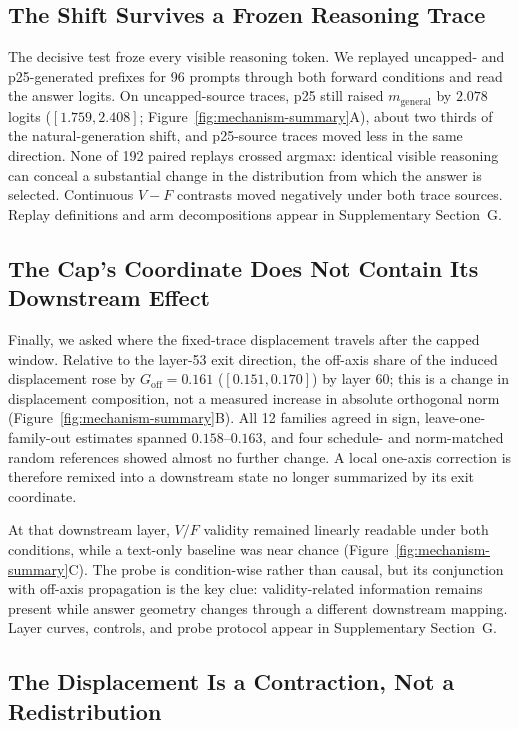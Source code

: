 \documentclass[letterpaper]{article} %
\begin{document}
\subsection{The Shift Survives a Frozen Reasoning Trace}

The decisive test froze every visible reasoning token. We replayed uncapped- and p25-generated prefixes for 96 prompts through both forward conditions and read the answer logits. On uncapped-source traces, p25 still raised $m_{\mathrm{general}}$ by $2.078$ logits ($[1.759,2.408]$; Figure~\ref{fig:mechanism-summary}A), about two thirds of the natural-generation shift, and p25-source traces moved less in the same direction. None of 192 paired replays crossed argmax: identical visible reasoning can conceal a substantial change in the distribution from which the answer is selected. Continuous $V-F$ contrasts moved negatively under both trace sources. Replay definitions and arm decompositions appear in Supplementary Section~G.

\subsection{The Cap's Coordinate Does Not Contain Its Downstream Effect}

Finally, we asked where the fixed-trace displacement travels after the capped window. Relative to the layer-53 exit direction, the off-axis share of the induced displacement rose by $G_{\mathrm{off}}=0.161$ ($[0.151,0.170]$) by layer 60; this is a change in displacement composition, not a measured increase in absolute orthogonal norm (Figure~\ref{fig:mechanism-summary}B). All 12 families agreed in sign, leave-one-family-out estimates spanned $0.158$--$0.163$, and four schedule- and norm-matched random references showed almost no further change. A local one-axis correction is therefore remixed into a downstream state no longer summarized by its exit coordinate.

At that downstream layer, $V/F$ validity remained linearly readable under both conditions, while a text-only baseline was near chance (Figure~\ref{fig:mechanism-summary}C). The probe is condition-wise rather than causal, but its conjunction with off-axis propagation is the key clue: validity-related information remains present while answer geometry changes through a different downstream mapping. Layer curves, controls, and probe protocol appear in Supplementary Section~G.

\subsection{The Displacement Is a Contraction, Not a Redistribution}
\label{sec:contraction}
\end{document}
